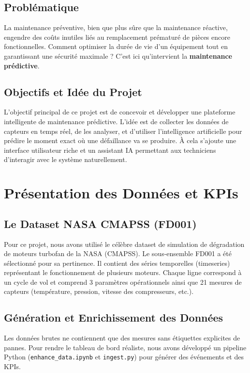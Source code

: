 \documentclass[12pt,a4paper]{report}
\begin{document}
\section{Problématique}
La maintenance préventive, bien que plus sûre que la maintenance réactive, engendre des coûts inutiles liés au remplacement prématuré de pièces encore fonctionnelles. Comment optimiser la durée de vie d'un équipement tout en garantissant une sécurité maximale ? C'est ici qu'intervient la \textbf{maintenance prédictive}.

\section{Objectifs et Idée du Projet}
L'objectif principal de ce projet est de concevoir et développer une plateforme intelligente de maintenance prédictive. L'idée est de collecter les données de capteurs en temps réel, de les analyser, et d'utiliser l'intelligence artificielle pour prédire le moment exact où une défaillance va se produire. À cela s'ajoute une interface utilisateur riche et un assistant IA permettant aux techniciens d'interagir avec le système naturellement.

\newpage

\chapter{Présentation des Données et KPIs}

\section{Le Dataset NASA CMAPSS (FD001)}
Pour ce projet, nous avons utilisé le célèbre dataset de simulation de dégradation de moteurs turbofan de la NASA (CMAPSS). Le sous-ensemble FD001 a été sélectionné pour sa pertinence.
Il contient des séries temporelles (timeseries) représentant le fonctionnement de plusieurs moteurs. Chaque ligne correspond à un cycle de vol et comprend 3 paramètres opérationnels ainsi que 21 mesures de capteurs (température, pression, vitesse des compresseurs, etc.).

\section{Génération et Enrichissement des Données}
Les données brutes ne contiennent que des mesures sans étiquettes explicites de pannes. Pour rendre le tableau de bord réaliste, nous avons développé un pipeline Python (\texttt{enhance\_data.ipynb} et \texttt{ingest.py}) pour générer des événements et des KPIs.
\end{document}

